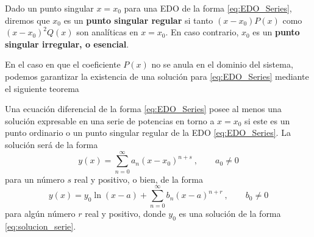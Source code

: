 \begin{defi} 
    Dado un punto singular $x=x_0$ para una EDO de la forma \eqref{eq:EDO_Series}, diremos que $x_0$ es un \textbf{punto singular regular} si tanto $(x-x_0)P(x)$ como $(x-x_0)^2Q(x)$ son analíticas en $x=x_0$. En caso contrario, $x_0$ es un \textbf{punto singular irregular, o esencial}.
\end{defi}

En el caso en que el coeficiente $P(x)$ no se anula en el dominio del sistema, podemos garantizar la existencia de una solución para \eqref{eq:EDO_Series} mediante el siguiente teorema
\begin{teorema}[de Fuchs]\label{teo:Fuchs}
    Una ecuación diferencial de la forma \eqref{eq:EDO_Series} posee al menos una solución expresable en una serie de potencias en torno a $x=x_0$ si este es un punto ordinario o un punto singular regular de la EDO \eqref{eq:EDO_Series}. La solución será de la forma 
    \begin{equation} \label{eq:solucion_serie}
        y(x) = \sum_{n=0}^\infty a_n(x-x_0)^{n+s} \ , \qquad a_0 \neq 0
    \end{equation}
    para un número $s$ real y positivo, o bien, de la forma 
    \begin{equation}
        y(x) = y_0 \ln(x-a) + \sum_{n=0}^\infty b_n (x-a)^{n+r} \ , \qquad b_0 \neq 0 
    \end{equation}
    para algún número $r$ real y positivo, donde $y_0$ es una solución de la forma \eqref{eq:solucion_serie}.
\end{teorema}
